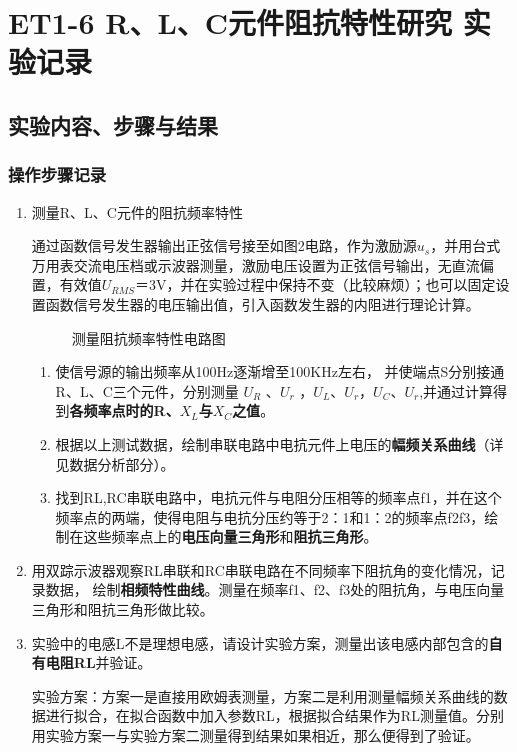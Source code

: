 \documentclass[dvipsnames, svgnames,a4paper,11pt]{article}
\begin{document}
	\section{ET1-6 \quad R、L、C元件阻抗特性研究  \quad\heiti 实验记录}
	
	\subsection{实验内容、步骤与结果}
	
	\subsubsection{操作步骤记录}
	\begin{enumerate}
		\item 测量R、L、C元件的阻抗频率特性
		
		通过函数信号发生器输出正弦信号接至如图2电路，作为激励源$u_s$，并用台式万用表交流电压档或示波器测量，激励电压设置为正弦信号输出，无直流偏置，有效值$U_{RMS}$＝3V，并在实验过程中保持不变（比较麻烦）；也可以固定设置函数信号发生器的电压输出值，引入函数发生器的内阻进行理论计算。

			\begin{figure}[htbp]
				\centering
				\quad
				\quad				
				\caption{测量阻抗频率特性电路图}
				\label{fig:graph2-2}
			\end{figure}

		\begin{enumerate}
			\item 使信号源的输出频率从100Hz逐渐增至100KHz左右， 并使端点S分别接通R、L、C三个元件，分别测量 $U_R$ 、$U_r$ ，$U_L$、$U_r$，$U_C$、$U_r$,并通过计算得到\textbf{各频率点时的R、$X_L$与$X_C$之值}。
			
			\item 根据以上测试数据，绘制串联电路中电抗元件上电压的\textbf{幅频关系曲线}（详见数据分析部分）。
			
			\item 找到RL,RC串联电路中，电抗元件与电阻分压相等的频率点f1，并在这个频率点的两端，使得电阻与电抗分压约等于2：1和1：2的频率点f2f3，绘制在这些频率点上的\textbf{电压向量三角形}和\textbf{阻抗三角形}。
		\end{enumerate}
		
		\item 用双踪示波器观察RL串联和RC串联电路在不同频率下阻抗角的变化情况，记录数据，
		绘制\textbf{相频特性曲线}。测量在频率f1、f2、f3处的阻抗角，与电压向量三角形和阻抗三角形做比较。
		
		\item 实验中的电感L不是理想电感，请设计实验方案，测量出该电感内部包含的\textbf{自有电阻RL}并验证。
		
			实验方案：方案一是直接用欧姆表测量，方案二是利用测量幅频关系曲线的数据进行拟合，在拟合函数中加入参数RL，根据拟合结果作为RL测量值。分别用实验方案一与实验方案二测量得到结果如果相近，那么便得到了验证。
	\end{enumerate}	
	
\end{document}
